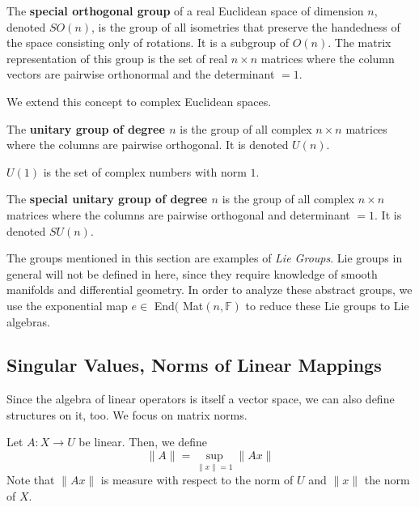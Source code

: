   \begin{definition}
    The \textbf{special orthogonal group} of a real Euclidean space of dimension $n$, denoted $SO(n)$, is the group of all isometries that preserve the handedness of the space consisting only of rotations. It is a subgroup of $O(n)$. The matrix representation of this group is the set of real $n \times n$ matrices where the column vectors are pairwise orthonormal and the determinant $=1$. 
  \end{definition}

  We extend this concept to complex Euclidean spaces. 

  \begin{definition}
    The \textbf{unitary group of degree $n$} is the group of all complex $n \times n$ matrices where the columns are pairwise orthogonal. It is denoted $U(n)$. 
  \end{definition}

  \begin{example}
    $U(1)$ is the set of complex numbers with norm $1$. 
  \end{example}

  \begin{definition}
    The \textbf{special unitary group of degree $n$} is the group of all complex $n \times n$ matrices where the columns are pairwise orthogonal and determinant $=1$. It is denoted $SU(n)$. 
  \end{definition}

  The groups mentioned in this section are examples of \textit{Lie Groups}. Lie groups in general will not be defined in here, since they require knowledge of smooth manifolds and differential geometry. In order to analyze these abstract groups, we use the exponential map $e \in$ End$($ Mat$(n, \mathbb{F})$ to reduce these Lie groups to Lie algebras.

\subsection{Singular Values, Norms of Linear Mappings}

  Since the algebra of linear operators is itself a vector space, we can also define structures on it, too. We focus on matrix norms. 

  \begin{definition}
    Let $A: X \longrightarrow U$ be linear. Then, we define
    \begin{equation}
      \|A\| = \sup_{\|x\|=1} \|A x\|
    \end{equation}
    Note that $\|A x\|$ is measure with respect to the norm of $U$ and $\|x\|$ the norm of $X$. 
  \end{definition}

